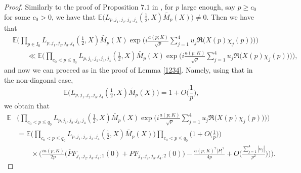 \documentclass[12pt, reqno]{amsart}
\newcommand{\E}{\mathbb{E}}
\numberwithin{equation}{section}
\numberwithin{theorem}{section}
\numberwithin{equation}{section}
\begin{document}
    \begin{proof}
    Similarly to the proof of Proposition $7.1$ in \cite{BFM}, for $p$ large enough, say $p \geq c_0$ for some $c_0>0$, we have that $\E \Big( L_{p,j_1,j_2,j_3,j_4}( \frac{1}{2},X) \widetilde{M_p}(X) \Big) \neq 0$. 
Then we have that
\begin{align} 
\label{ll}
  &\E \Bigg( \prod_{p \in I_0} L_{p,j_1,j_2,j_3,j_4}( \tfrac{1}{2},X) \widetilde{M_p}(X) \exp \bigg(  i \frac{a(p;K)}{
    \sqrt{p}}\sum_{j=1}^4   u_j \Re \big(X(p) \chi_j(p)\big)\bigg) \Bigg) \nonumber\\
    &\qquad\ll   \E  \Bigg( \prod_{c_0<p\leq q_0} L_{p,j_1,j_2,j_3,j_4}( \tfrac{1}{2},X) \widetilde{M_p}(X) \exp \bigg(  i \frac{a(p;K)}{
    \sqrt{p}}\sum_{j=1}^4   u_j \Re \big(X(p) \chi_j(p)\big)\bigg) \Bigg), 
    \end{align}
and now we can proceed as in the proof of Lemma \ref{1234}. Namely, using that in the non-diagonal case,
$$ \E  \Big(L_{p,j_1,j_2,j_3,j_4}( \tfrac{1}{2},X) \widetilde{M_p}(X)  \Big) =1 + O \Big( \frac{1}{p} \Big),  $$ we obtain that
\begin{align}\label{interm3}
      \E & \Bigg( \prod_{c_0<p \leq q_0} L_{p,j_1,j_2,j_3,j_4}( \tfrac{1}{2},X) \widetilde{M_p}(X) \exp \bigg(  i \frac{a(p;K)}{
    \sqrt{p}}\sum_{j=1}^4   u_j \Re \big(X(p) \chi_j(p)\big)\bigg) \Bigg) \\
    &=   \E  \Bigg( \prod_{c_0<p \leq q_0} L_{p,j_1,j_2,j_3,j_4}( \tfrac{1}{2},X) \widetilde{M_p}(X)  \Bigg)\prod_{c_0<p \leq q_0} \bigg(1 + O \Big( \frac{1}{p} \Big) \bigg)\nonumber\\
    &\qquad\times \bigg( \frac{ i a(p;K)}{2p} \big( \overline{P} F_{j_1,j_2,j_3,j_4;1}(0)+ P F_{j_1,j_2,j_3,j_4;2}(0) \big)- \frac{a(p;K)^2 |P|^2}{4p} +  O \Big(  \frac{\sum_{j=1}^4 |u_j|}{p^{2}}\Big)\bigg) \Bigg).\nonumber
\end{align}
        

\end{proof}
\end{document}
